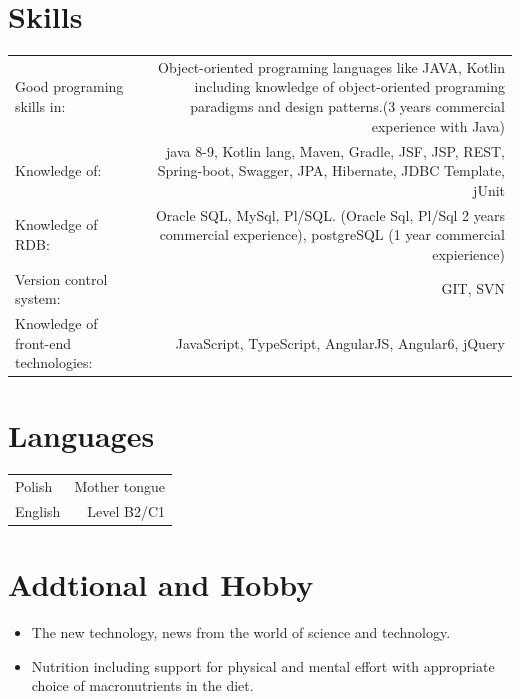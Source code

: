 \documentclass[1pt]{my_cv}
\begin{document}
	\section*{Skills}
	\begin{tabular}{L!{\VRule}R}
		Good programing skills in:&Object-oriented programing languages like JAVA, Kotlin including knowledge of object-oriented programing paradigms and design patterns.(3 years commercial experience with Java)\\
		Knowledge of:& java 8-9, Kotlin lang, Maven, Gradle, JSF, JSP, REST, Spring-boot, Swagger, JPA, Hibernate, JDBC Template, jUnit\\
		Knowledge of RDB:& Oracle SQL, MySql, Pl/SQL. (Oracle Sql, Pl/Sql 2 years commercial experience), postgreSQL (1 year commercial expierience) \\
		Version control system:& GIT, SVN \\
		Knowledge of front-end technologies:& JavaScript, TypeScript, AngularJS, Angular6, jQuery
	\end{tabular}
	\section*{Languages}
	\begin{tabular}{L!{\VRule}R}
		Polish&Mother tongue\\
		English&Level B2/C1
	\end{tabular}
	\section*{Addtional and Hobby}	
		\begin{itemize} \itemsep 0pt \parskip 0pt \parsep 0pt 			
		\item The new technology, news from the world of science and technology.
		\item Nutrition including support for physical and mental effort with appropriate choice of macronutrients in the diet. 
		\end{itemize}

	
\end{document}
